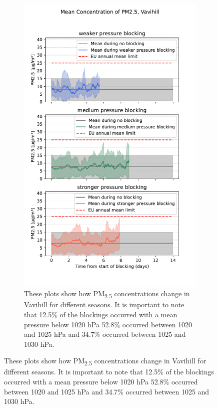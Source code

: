 \begin{figure}[H]
    \centering
    \begin{subfigure}[b]{0.49\textwidth}
        \centering
        \includegraphics[width=\textwidth]{Figures/Meanplot_pressure_Vavihill.pdf}
        \caption{These plots show how PM\textsubscript{2.5} concentrations change in Vavihill for different seasons. It is important to note that 12.5\% of the blockings occurred with a mean pressure below 1020 hPa 52.8\% occurred between 1020 and 1025 hPa and 34.7\% occurred between 1025 and 1030 hPa.}
        \label{fig:Meanplot_pressure_Vavihill}
    \end{subfigure}

\end{figure}
